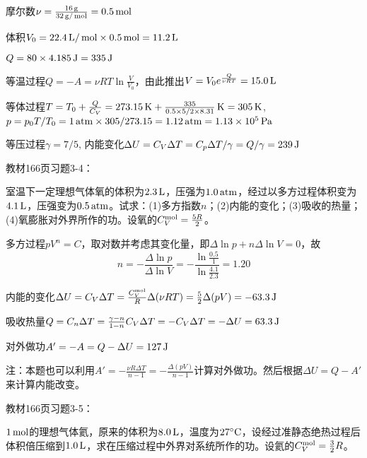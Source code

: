 \documentclass[CJK]{beamer}
\begin{document}
\begin{frame}
  \bch
  摩尔数$\nu = \frac{16\,\mathrm{g}}{32\,\mathrm{g}/\,\mathrm{mol}} = 0.5\,\mathrm{mol}$
  
  体积$V_0 = 22.4\,\mathrm{L}/\,\mathrm{mol} \times 0.5\,\mathrm{mol} = 11.2\,\mathrm{L}$

  $Q = 80\times 4.185 \,\mathrm{J} = 335\,\mathrm{J}$
  \bitem
\item{等温过程$Q = -A = \nu RT \ln\frac{V}{V_0}$，由此推出$V = V_0e^{\frac{Q}{\nu RT}} = 15.0\,\mathrm{L}$}
\item{等体过程$T = T_0+ \frac{Q}{C_V} = 273.15\,\mathrm{K} + \frac{335}{0.5\times 5/2\times 8.31}\,\mathrm{K} = 305\,\mathrm{K}$, $p = p_0 T/T_0 = 1\,\mathrm{atm} \times 305/273.15 = 1.12 \,\mathrm{atm} = 1.13\times 10^5\,\mathrm{Pa}$}
\item{等压过程$\gamma = 7/5$, 内能变化$\Delta U = C_V\Delta T = C_p\Delta T /\gamma = Q/\gamma = 239\,\mathrm{J}$}
  \eitem
  
  \ech
\end{frame}

\begin{frame}
  \chtitle{\proid (\stwo)}
  \bch
  教材166页习题3-4：

  室温下一定理想气体氧的体积为$2.3\,\mathrm{L}$，压强为$1.0\,\mathrm{atm}$，经过以多方过程体积变为$4.1\,\mathrm{L}$，压强变为$0.5\,\mathrm{atm}$。试求：(1)多方指数$n$；(2)内能的变化；(3)吸收的热量；(4)氧膨胀对外界所作的功。设氧的$C_V^{\rm mol}=\frac{5R}{2}$。
  \ech
\end{frame}

\begin{frame}
  \bch
      {\small
        \bitem
      \item{
        多方过程$pV^n = C$，取对数并考虑其变化量，即$\Delta \ln p + n \Delta \ln V = 0$，故
        $$n = - \frac{\Delta \ln p}{\Delta \ln V} = -\frac{\ln\frac{0.5}{1}}{\ln\frac{4.1}{2.3}} = 1.20 $$}
      \item{内能的变化$\Delta U  = C_V\Delta T = \frac{C_V^{\rm mol}}{R}\Delta (\nu RT) = \frac{5}{2}\Delta(pV) = -63.3\,\mathrm{J}$}
      \item{吸收热量$Q = C_n \Delta T = \frac{\gamma-n}{1-n}C_V\Delta T = -C_V\Delta T = -\Delta U = 63.3\,\mathrm{J}$}
      \item{对外做功$A'=-A = Q-\Delta U = 127\,\mathrm{J}$}
        \eitem
        \skipline
        
注：本题也可以利用$A' = -\frac{\nu R \Delta T}{n-1} =-\frac{\Delta(pV)}{n-1}$计算对外做功。然后根据$\Delta U = Q-A'$来计算内能改变。        
  }
  \ech
\end{frame}

\begin{frame}
  \chtitle{\proid (\sone)}
  \bch
  教材166页习题3-5：

  $1\,\mathrm{mol}$的理想气体氦，原来的体积为$8.0\,\mathrm{L}$，温度为$27^\circ \mathrm{C}$，设经过准静态绝热过程后体积倍压缩到$1.0\,\mathrm{L}$，求在压缩过程中外界对系统所作的功。设氦的$C_V^{\rm mol} = \frac{3}{2}R$。
  \ech
\end{frame}
\end{document}
